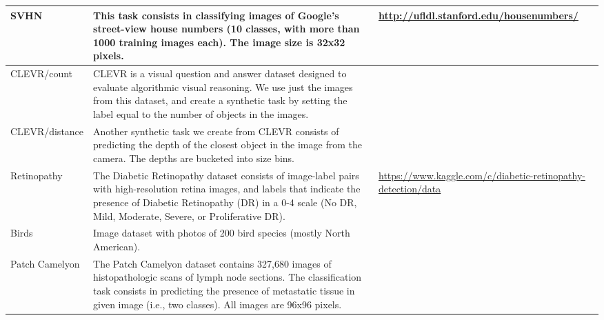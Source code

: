 \documentclass{article}
\begin{document}
\begin{table}[ht]
{{\begin{tabular}{l p{12cm} p{5cm}}
      SVHN & This task consists in classifying images of Google’s street-view house numbers (10 classes, with more than 1000 training images each). The image size is 32x32 pixels.& \url{http://ufldl.stanford.edu/housenumbers/}\\ \midrule
      CLEVR/count & CLEVR is a visual question and answer dataset designed to evaluate algorithmic visual reasoning. We use just the images from this dataset, and create a synthetic task by setting the label equal to the number of objects in the images.& ~\citep{johnson2017clevr}\\ \midrule
      CLEVR/distance & Another synthetic task we create from CLEVR consists of predicting the depth of the closest object in the image from the camera. The depths are bucketed into size bins. &~\citep{johnson2017clevr}\\ \midrule
      Retinopathy & The Diabetic Retinopathy dataset consists of image-label pairs with high-resolution retina images, and labels that indicate the presence of Diabetic Retinopathy (DR) in a 0-4 scale (No DR, Mild, Moderate, Severe, or Proliferative DR). & \url{https://www.kaggle.com/c/diabetic-retinopathy-detection/data} \\ \midrule 
      Birds &  Image dataset with photos of 200 bird species (mostly North American). &~\citep{WahCUB_200_2011} \\ \midrule
      
      Patch Camelyon & The Patch Camelyon dataset contains 327,680 images of histopathologic scans of lymph node sections. The classification task consists in predicting the presence of metastatic tissue in given image (i.e., two classes). All images are 96x96 pixels. &~\citep{teh2019metric}\\ \midrule
      

\end{tabular}}}
\end{table}
\end{document}
